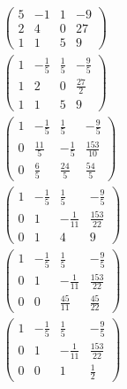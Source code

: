 \documentclass{article}
\begin{document}
\begin{align*}
  \left( \begin{array}{ccc|c}
             5 & -1 & 1 & -9 \\
             2 & 4  & 0 & 27 \\
             1 & 1  & 5 & 9
           \end{array} \right)                               \\
  \left( \begin{array}{ccc|c}
             1 & -\frac{1}{5} & \frac{1}{5} & -\frac{9}{5} \\
             1 & 2            & 0           & \frac{27}{2} \\
             1 & 1            & 5           & 9
           \end{array} \right)     \\
  \left( \begin{array}{ccc|c}
             1 & -\frac{1}{5} & \frac{1}{5}  & -\frac{9}{5}   \\
             0 & \frac{11}{5} & -\frac{1}{5} & \frac{153}{10} \\
             0 & \frac{6}{5}  & \frac{24}{5} & \frac{54}{5}
           \end{array} \right)  \\
  \left( \begin{array}{ccc|c}
             1 & -\frac{1}{5} & \frac{1}{5}   & -\frac{9}{5}   \\
             0 & 1            & -\frac{1}{11} & \frac{153}{22} \\
             0 & 1            & 4             & 9
           \end{array} \right) \\
  \left( \begin{array}{ccc|c}
             1 & -\frac{1}{5} & \frac{1}{5}   & -\frac{9}{5}   \\
             0 & 1            & -\frac{1}{11} & \frac{153}{22} \\
             0 & 0            & \frac{45}{11} & \frac{45}{22}
           \end{array} \right) \\
  \left( \begin{array}{ccc|c}
             1 & -\frac{1}{5} & \frac{1}{5}   & -\frac{9}{5}   \\
             0 & 1            & -\frac{1}{11} & \frac{153}{22} \\
             0 & 0            & 1             & \frac{1}{2}
           \end{array} \right) \\

\end{align*}
\end{document}
